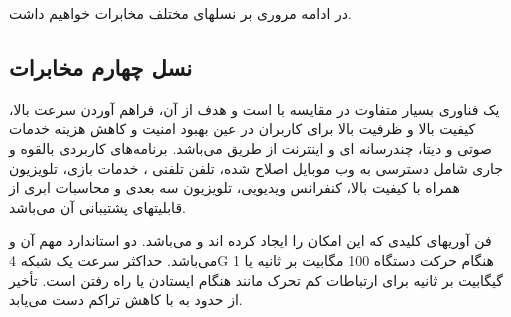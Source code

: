 در ادامه مروری بر نسلهای مختلف مخابرات خواهیم داشت.
\subsection{ نسل چهارم مخابرات}
 یک فناوری بسیار متفاوت در مقایسه با  است و هدف از آن، فراهم آوردن سرعت بالا، کیفیت بالا و ظرفیت بالا برای کاربران در عین بهبود امنیت و کاهش هزینه خدمات صوتی و دیتا، چندرسانه ای و اینترنت از طریق  می‌باشد. برنامه‌های کاربردی بالقوه و جاری شامل دسترسی به وب موبایل اصلاح شده، تلفن تلفنی ، خدمات بازی، تلویزیون همراه با کیفیت بالا، کنفرانس ویدیویی، تلویزیون سه بعدی و محاسبات ابری از قابلیتهای پشتیبانی آن می‌باشد.

فن آوریهای کلیدی که این امکان را ایجاد کرده اند 
 
 و
   
می‌باشد.
دو استاندارد مهم آن
 
و
می‌باشد.
حداکثر سرعت یک شبکه 4G هنگام حرکت دستگاه 100 مگابیت بر ثانیه یا 1 گیگابیت بر ثانیه برای ارتباطات کم تحرک مانند هنگام ایستادن یا راه رفتن است. تأخیر از حدود  به  با کاهش تراکم دست می‌یابد.
